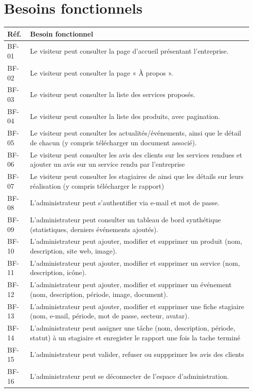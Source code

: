 \documentclass[11pt,a4paper]{report}
\begin{document}
\section{Besoins fonctionnels}

\begin{center}
\renewcommand{\arraystretch}{1.3}
\begin{longtable}{L{1.3cm} L{11.5cm}}
\toprule
{}
\textbf{Réf.} & \textbf{Besoin fonctionnel} \\
\midrule
\endhead
BF-01 & Le visiteur peut consulter la page d'accueil présentant l'entreprise. \\
BF-02 & Le visiteur peut consulter la page « À propos ». \\
BF-03 & Le visiteur peut consulter la liste des services proposés. \\
BF-04 & Le visiteur peut consulter la liste des produits, avec pagination. \\
BF-05 & Le visiteur peut consulter les actualités/événements, ainsi que le
détail de chacun (y compris télécharger un document associé). \\
BF-06 & Le visiteur peut consulter les avis des clients sur les services rendues et ajouter un avis sur un service rendu par l'entreprise \\
BF-07 & Le visiteur peut consulter les stagiaires de ainsi que les détails sur leurs réalisation (y compris télécharger le rapport) \\
BF-08 & L'administrateur peut s'authentifier via e-mail et mot de passe. \\
BF-09 & L'administrateur peut consulter un tableau de bord synthétique
(statistiques, derniers événements ajoutés). \\
BF-10 & L'administrateur peut ajouter, modifier et supprimer un produit
(nom, description, site web, image). \\
BF-11 & L'administrateur peut ajouter, modifier et supprimer un service
(nom, description, icône). \\
BF-12 & L'administrateur peut ajouter, modifier et supprimer un événement
(nom, description, période, image, document). \\
BF-13 & L'administrateur peut ajouter, modifier et supprimer une fiche
stagiaire (nom, e-mail, période, mot de passe, secteur, avatar). \\
BF-14 & L'administrateur peut assigner une tâche (nom, description, période, statut) à un stagiaire et enregister le rapport une fois la tache terminé \\
BF-15 & L'administrateur peut valider, refuser ou suppprimer les avis des clients \\
BF-16 & L'administrateur peut se déconnecter de l'espace d'administration. \\
\bottomrule
\end{longtable}
\end{center}
\end{document}
